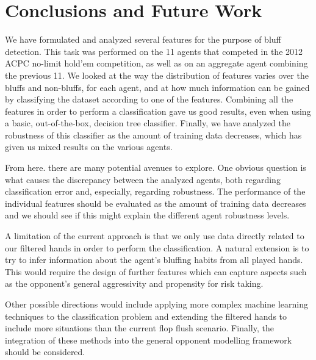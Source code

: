 \documentclass[letterpaper]{article}
\begin{document}
\section{
\fontsize{12pt}{15pt} 
\selectfont
Conclusions and Future Work}
\fontsize{10pt}{12pt} 
\selectfont
We have formulated and analyzed several features for the purpose of bluff detection. This task was performed on the 11 agents that competed in the 2012 ACPC no-limit hold'em competition, as well as on an aggregate agent combining the previous 11. We looked at the way the distribution of features varies over the bluffs and non-bluffs, for each agent, and at how much information can be gained by classifying the dataset according to one of the features. Combining all the features in order to perform a classification gave us good results, even when using a basic, out-of-the-box, decision tree classifier. Finally, we have analyzed the robustness of this classifier as the amount of training data decreases, which has given us mixed results on the various agents.

From here. there are many potential avenues to explore. One obvious question is what causes the discrepancy between the analyzed agents, both regarding classification error and, especially, regarding robustness. The performance of the individual features should be evaluated as the amount of training data decreases and we should see if this might explain the different agent robustness levels. 

A limitation of the current approach is that we only use data directly related to our filtered hands in order to perform the classification. A natural extension is to try to infer information about the agent's bluffing habits from all played hands. This would require the design of further features which can capture aspects such as the opponent's general aggressivity and propensity for risk taking.

Other possible directions would include applying more complex machine learning techniques to the classification problem and extending the filtered hands to include more situations than the current flop flush scenario. Finally, the integration of these methods into the general opponent modelling framework should be considered.


\end{document}
